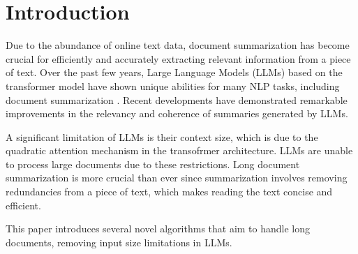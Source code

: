 \section{Introduction}
\label{sec:introduction}

Due to the abundance of online text data, document summarization has become crucial
for efficiently and accurately extracting relevant information from a piece of text.
Over the past few years, Large Language Models (LLMs) based on the transformer model
\cite{vaswani2017attention} have shown unique abilities for many NLP tasks, including
document summarization \cite{yadav2023state}.
Recent developments have demonstrated remarkable improvements in the relevancy and
coherence of summaries generated by LLMs.

A significant limitation of LLMs is their context size, which is due to the quadratic
attention mechanism in the transofrmer architecture.
LLMs are unable to process large documents due to these restrictions.
Long document summarization is more crucial than ever since summarization involves
removing redundancies from a piece of text, which makes reading the text concise and
efficient.

This paper introduces several novel algorithms that aim to handle long documents,
removing input size limitations in LLMs.
